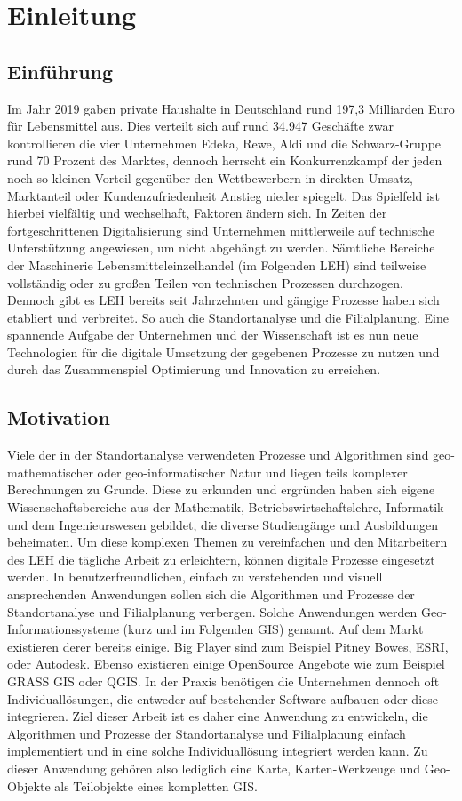 \chapter{Einleitung}
\section{Einführung}
Im Jahr 2019 gaben private Haushalte in Deutschland rund 197,3 Milliarden Euro für Lebensmittel aus. \cite{statista2019Ausgaben}
Dies verteilt sich auf rund 34.947 Geschäfte zwar kontrollieren die vier Unternehmen Edeka, Rewe, Aldi und die Schwarz-Gruppe rund 70 Prozent des Marktes, dennoch herrscht ein Konkurrenzkampf der jeden noch so kleinen Vorteil gegenüber den Wettbewerbern in direkten Umsatz, Marktanteil oder Kundenzufriedenheit Anstieg nieder spiegelt.  \cite{statista2018Geschäfte}
Das Spielfeld ist hierbei vielfältig und wechselhaft, Faktoren ändern sich. In Zeiten der fortgeschrittenen Digitalisierung sind Unternehmen mittlerweile auf technische Unterstützung angewiesen, um nicht abgehängt zu werden. Sämtliche Bereiche der Maschinerie Lebensmitteleinzelhandel (im Folgenden LEH) sind teilweise vollständig oder zu großen Teilen von technischen Prozessen durchzogen.
Dennoch gibt es LEH bereits seit Jahrzehnten und gängige Prozesse haben sich etabliert und verbreitet. So auch die Standortanalyse und die Filialplanung. Eine spannende Aufgabe der Unternehmen und der Wissenschaft ist es nun neue Technologien für die digitale Umsetzung der gegebenen Prozesse zu nutzen und durch das Zusammenspiel Optimierung und Innovation zu erreichen. 

\section{Motivation}
Viele der in der Standortanalyse verwendeten Prozesse und Algorithmen sind geo-mathematischer oder geo-informatischer Natur und liegen teils komplexer Berechnungen zu Grunde.
Diese zu erkunden und ergründen haben sich eigene Wissenschaftsbereiche aus der Mathematik, Betriebswirtschaftslehre, Informatik und dem Ingenieurswesen gebildet, die diverse Studiengänge und Ausbildungen beheimaten.
Um diese komplexen Themen zu vereinfachen und den Mitarbeitern des LEH die tägliche Arbeit zu erleichtern, können digitale Prozesse eingesetzt werden.
In benutzerfreundlichen, einfach zu verstehenden und visuell ansprechenden Anwendungen sollen sich die Algorithmen und Prozesse der Standortanalyse und Filialplanung verbergen. 
Solche Anwendungen werden Geo-Informationssysteme (kurz und im Folgenden GIS) genannt.
Auf dem Markt existieren derer bereits einige.
Big Player sind zum Beispiel Pitney Bowes, ESRI, oder Autodesk.
Ebenso existieren einige OpenSource Angebote wie zum Beispiel GRASS GIS oder QGIS.
In der Praxis benötigen die Unternehmen dennoch oft Individuallösungen, die entweder auf bestehender Software aufbauen oder diese integrieren.
Ziel dieser Arbeit ist es daher eine Anwendung zu entwickeln, die Algorithmen und Prozesse der Standortanalyse und Filialplanung einfach implementiert und in eine solche Individuallösung integriert werden kann.
Zu dieser Anwendung gehören also lediglich eine Karte, Karten-Werkzeuge und Geo-Objekte als Teilobjekte eines kompletten GIS.


